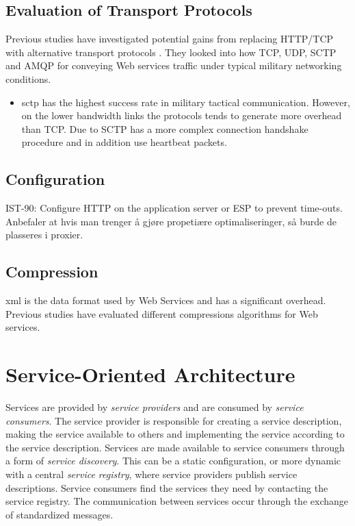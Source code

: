 \documentclass[USenglish]{ifimaster}
\begin{document}
\subsection{Evaluation of Transport Protocols}

Previous studies have investigated potential gains from replacing HTTP/TCP
with alternative transport protocols
\cite{evaluation-transport-protocols-web-services}. They looked into how TCP,
UDP, SCTP and AMQP for conveying Web services traffic under typical military
networking conditions.

\begin{itemize}
    \item \gls{sctp} has the highest success rate in military tactical
    communication. However, on the lower bandwidth links the protocols tends to
     generate more overhead than TCP. Due to SCTP has a more complex connection
     handshake procedure and in addition use heartbeat packets.
\end{itemize}

\subsection{Configuration}
IST-90: Configure HTTP on the application server or ESP to prevent time-outs.
Anbefaler at hvis man trenger å gjøre propetiære optimaliseringer, så burde de
plasseres i proxier.


\subsection{Compression}

\gls{xml} is the data format used by Web Services and has a significant
overhead. Previous studies have evaluated different compressions algorithms for
Web services.


\section{Service-Oriented Architecture}
Services are provided by \textit{service providers} and are consumed by
\textit{service consumers}. The service provider is responsible for creating a
service description, making the service available to others and implementing the
service according to the service description. Services are made available to
service consumers through a form of \textit{service discovery}. This can be a
static configuration, or more dynamic with a central \textit{service registry},
where service providers publish service descriptions. Service consumers find the
services they need by contacting the service registry. The communication between
services occur through the exchange of standardized messages.
\end{document}
